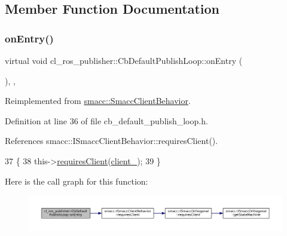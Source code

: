 \subsection{Member Function Documentation}
\mbox{\label{classcl__ros__publisher_1_1CbDefaultPublishLoop_a6e6cfb477cbefc510ca7b55a061545e4}} 
\subsubsection{\texorpdfstring{on\+Entry()}{onEntry()}}
{\footnotesize\ttfamily virtual void cl\+\_\+ros\+\_\+publisher\+::\+Cb\+Default\+Publish\+Loop\+::on\+Entry (\begin{DoxyParamCaption}{ }\end{DoxyParamCaption})\hspace{0.3cm}{\ttfamily [inline]}, {\ttfamily [override]}, {\ttfamily [virtual]}}



Reimplemented from \hyperlink{classsmacc_1_1SmaccClientBehavior_ad5d3e1f1697c3cfe66c94cadba948493}{smacc\+::\+Smacc\+Client\+Behavior}.



Definition at line 36 of file cb\+\_\+default\+\_\+publish\+\_\+loop.\+h.



References smacc\+::\+I\+Smacc\+Client\+Behavior\+::requires\+Client().


\begin{DoxyCode}
37     \{
38         this->\hyperlink{classsmacc_1_1ISmaccClientBehavior_a32b16e99e3b4cb289414203dc861a440}{requiresClient}(\hyperlink{classcl__ros__publisher_1_1CbDefaultPublishLoop_a483b8c34b88dadc718fbf4bf1f95acb5}{client\_});
39     \}
\end{DoxyCode}
Here is the call graph for this function\+:
\nopagebreak
\begin{figure}[H]
\begin{center}
\leavevmode
\includegraphics[width=350pt]{classcl__ros__publisher_1_1CbDefaultPublishLoop_a6e6cfb477cbefc510ca7b55a061545e4_cgraph}
\end{center}
\end{figure}
\mbox{\label{classcl__ros__publisher_1_1CbDefaultPublishLoop_a206c6bc09e7c6414304b679ec415c19f}} 
